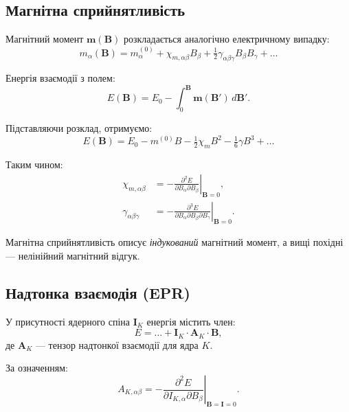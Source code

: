 \subsection{Магнітна сприйнятливість}

Магнітний момент \(\mathbf m(\mathbf B)\) розкладається аналогічно електричному випадку:
\begin{equation}
	m_\alpha(\mathbf B)
	= m_\alpha^{(0)} + \chi_{m,\alpha\beta} B_\beta + \tfrac12 \gamma_{\alpha\beta\gamma} B_\beta B_\gamma + \dots
\end{equation}

Енергія взаємодії з полем:
\begin{equation}
	E(\mathbf B) = E_0 - \int_0^{\mathbf B} \mathbf m(\mathbf B')\, d\mathbf B'.
\end{equation}

Підставляючи розклад, отримуємо:
\begin{equation}
	E(\mathbf B)
	= E_0
	- m^{(0)} B
	- \tfrac12 \chi_m B^2
	- \tfrac16 \gamma B^3
	+ \dots
\end{equation}

Таким чином:
\begin{align}
	\chi_{m,\alpha\beta}
	&= -\left.\frac{\partial^2 E}{\partial B_\alpha \partial B_\beta}\right|_{\mathbf B=0}, \\
	\gamma_{\alpha\beta\gamma}
	&= -\left.\frac{\partial^3 E}{\partial B_\alpha \partial B_\beta \partial B_\gamma}\right|_{\mathbf B=0}.
\end{align}

Магнітна сприйнятливість описує \emph{індукований} магнітний момент, а вищі похідні — нелінійний магнітний відгук.

\subsection{Надтонка взаємодія (EPR)}

У присутності ядерного спіна \(\mathbf I_K\) енергія містить член:
\begin{equation}
	E = \dots + \mathbf I_K \cdot \mathbf A_K \cdot \mathbf B,
\end{equation}
де \(\mathbf A_K\) — тензор надтонкої взаємодії для ядра \(K\).

За означенням:
\begin{equation}
	A_{K,\alpha\beta}
	= -\left.\frac{\partial^2 E}{\partial I_{K,\alpha} \partial B_\beta}\right|_{\mathbf B=\mathbf I=0}.
\end{equation}

